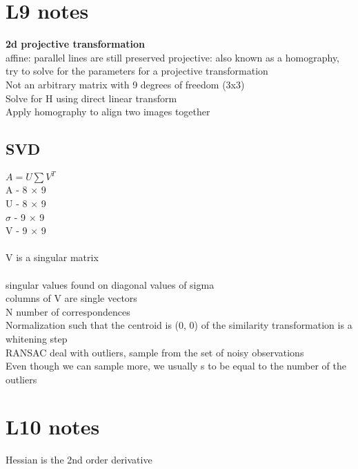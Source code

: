 \documentclass[11pt]{article}
\begin{document}
\section*{L9 notes}
\textbf{2d projective transformation}\\
affine: parallel lines are still preserved
projective: also known as a homography, try to solve for the parameters for  a projective transformation\\
Not an arbitrary matrix with 9 degrees of freedom (3x3)\\
Solve for H using direct linear transform
\\
Apply homography to align two images together
\subsection*{SVD}
$A = U \sum V^{T}$\\
A - 8 $\times$ 9\\
U - 8 $\times$ 9\\
$\sigma$ - 9 $\times$ 9\\
V - 9 $\times$ 9\\
\\
V is a singular matrix\\\\
singular values found on diagonal values of sigma\\
columns of V are single vectors
\\
N number of correspondences
\\ 
Normalization such that the centroid is (0, 0) of the similarity transformation is a whitening step
\\
RANSAC deal with outliers, sample from the set of noisy observations
\\
Even though we can sample more, we usually s to be equal to the number of the outliers
\section*{L10 notes}
Hessian is the 2nd order derivative\\
\end{document}
